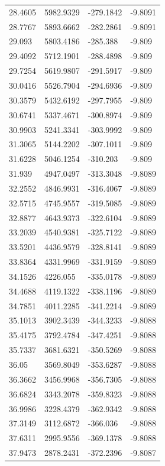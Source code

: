 \begin{table}[H]
\begin{tabular}{llll}
28.4605 & 5982.9329 & -279.1842 & -9.8091 \\
28.7767 & 5893.6662 & -282.2861 & -9.8091 \\
29.093 & 5803.4186 & -285.388 & -9.809 \\
29.4092 & 5712.1901 & -288.4898 & -9.809 \\
29.7254 & 5619.9807 & -291.5917 & -9.809 \\
30.0416 & 5526.7904 & -294.6936 & -9.809 \\
30.3579 & 5432.6192 & -297.7955 & -9.809 \\
30.6741 & 5337.4671 & -300.8974 & -9.809 \\
30.9903 & 5241.3341 & -303.9992 & -9.809 \\
31.3065 & 5144.2202 & -307.1011 & -9.809 \\
31.6228 & 5046.1254 & -310.203 & -9.809 \\
31.939 & 4947.0497 & -313.3048 & -9.8089 \\
32.2552 & 4846.9931 & -316.4067 & -9.8089 \\
32.5715 & 4745.9557 & -319.5085 & -9.8089 \\
32.8877 & 4643.9373 & -322.6104 & -9.8089 \\
33.2039 & 4540.9381 & -325.7122 & -9.8089 \\
33.5201 & 4436.9579 & -328.8141 & -9.8089 \\
33.8364 & 4331.9969 & -331.9159 & -9.8089 \\
34.1526 & 4226.055 & -335.0178 & -9.8089 \\
34.4688 & 4119.1322 & -338.1196 & -9.8089 \\
34.7851 & 4011.2285 & -341.2214 & -9.8089 \\
35.1013 & 3902.3439 & -344.3233 & -9.8088 \\
35.4175 & 3792.4784 & -347.4251 & -9.8088 \\
35.7337 & 3681.6321 & -350.5269 & -9.8088 \\
36.05 & 3569.8049 & -353.6287 & -9.8088 \\
36.3662 & 3456.9968 & -356.7305 & -9.8088 \\
36.6824 & 3343.2078 & -359.8323 & -9.8088 \\
36.9986 & 3228.4379 & -362.9342 & -9.8088 \\
37.3149 & 3112.6872 & -366.036 & -9.8088 \\
37.6311 & 2995.9556 & -369.1378 & -9.8088 \\
37.9473 & 2878.2431 & -372.2396 & -9.8087 \\

\end{tabular}
\end{table}
